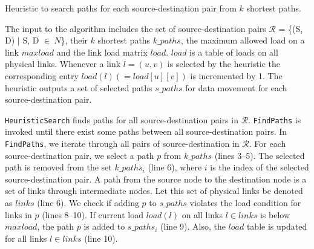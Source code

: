 \begin{algorithm}%
\SetAlgoLined\DontPrintSemicolon
{}
\BlankLine
\caption{Heuristic to search paths for each source-destination pair from $k$ shortest paths.}
\label{alg:heu}
\end{algorithm}

The input to the algorithm includes the set of source-destination pairs $\mathcal{R}$ = \{(S, D) $|$ S, D $\in~N$\}, their $k$ shortest paths {$k\_paths$}, the maximum allowed load on a link $maxload$ and the link load matrix $load$. $load$ is a table of loads on all physical links. Whenever a link $l=(u,v)$ is selected by the heuristic the corresponding entry $load(l) (= load[u][v])$ is incremented by 1. The heuristic outputs a set of selected paths $s\_paths$ for data movement for each source-destination pair. 

\texttt{HeuristicSearch} finds paths for all source-destination pairs in $\mathcal{R}$. \texttt{FindPaths} is invoked until there exist some paths between all source-destination pairs. In \texttt{FindPaths}, we iterate through all pairs of source-destination in $\mathcal{R}$. For each source-destination pair, we select a path $p$ from $k\_paths$ (lines 3--5). The selected path is removed from the set $k\_paths_i$ (line 6), where $i$ is the index of the selected source-destination pair. A path from the source node to the destination node is a set of links through intermediate nodes. Let this set of physical links be denoted as $links$ (line 6). We check if adding $p$ to $s\_paths$ violates the load condition for links in $p$ (lines 8--10). If current load $load(l)$ on all links $l \in links$ is below $maxload$, the path $p$ is added to $s\_paths_i$ (line 9). Also, the $load$ table is updated for all links $l \in links$ (line 10). 

